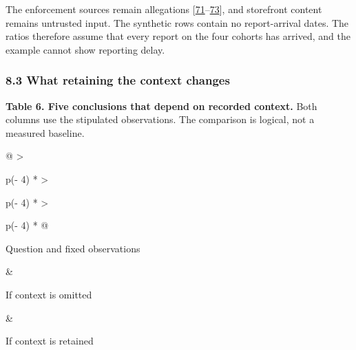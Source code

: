\documentclass[
  11pt,
]{article}
\begin{document}
The enforcement sources remain allegations
{[}\protect\hyperlink{ref-FTC2020FirstData}{71}--\protect\hyperlink{ref-FTC2019Allied}{73}{]},
and storefront content remains untrusted input. The synthetic rows
contain no report-arrival dates. The ratios therefore assume that every
report on the four cohorts has arrived, and the example cannot show
reporting delay.

\hypertarget{what-retaining-the-context-changes}{%
\subsubsection{8.3 What retaining the context
changes}\label{what-retaining-the-context-changes}}

\suppressfloats[t]
\begin{table}[!ht]
\textbf{Table 6. Five conclusions that depend on recorded context.} Both
columns use the stipulated observations. The comparison is logical, not
a measured baseline.\par\smallskip
{\small
\begin{tabular}{@{}
  >{\raggedright\arraybackslash}p{(\columnwidth - 4\tabcolsep) * }
  >{\raggedright\arraybackslash}p{(\columnwidth - 4\tabcolsep) * }
  >{\raggedright\arraybackslash}p{(\columnwidth - 4\tabcolsep) * }@{}}
\toprule\noalign{}
\begin{minipage}[b]{\linewidth}\raggedright
Question and fixed observations
\end{minipage} & \begin{minipage}[b]{\linewidth}\raggedright
If context is omitted
\end{minipage} & \begin{minipage}[b]{\linewidth}\raggedright
If context is retained
\end{minipage} \\
\midrule\noalign{}


\end{tabular}}
\end{table}
\end{document}
